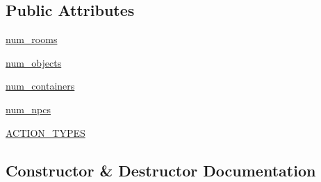 \subsection*{Public Attributes}
\begin{DoxyCompactItemize}
\item 
\hyperlink{classprojects_1_1mastering__the__dungeon_1_1agents_1_1graph__world2_1_1agents_1_1ObjectChecklistDataAgent_a0a3aeb5a5f0048b2f8af84249d447fa3}{num\+\_\+rooms}
\item 
\hyperlink{classprojects_1_1mastering__the__dungeon_1_1agents_1_1graph__world2_1_1agents_1_1ObjectChecklistDataAgent_ae5e3fbd73e051cb3d9e9f7e71fa113cd}{num\+\_\+objects}
\item 
\hyperlink{classprojects_1_1mastering__the__dungeon_1_1agents_1_1graph__world2_1_1agents_1_1ObjectChecklistDataAgent_ac2d3a47e2eaaae644df824f2206dadf2}{num\+\_\+containers}
\item 
\hyperlink{classprojects_1_1mastering__the__dungeon_1_1agents_1_1graph__world2_1_1agents_1_1ObjectChecklistDataAgent_a5bab15be5226dbff7ad3362f790abf34}{num\+\_\+npcs}
\item 
\hyperlink{classprojects_1_1mastering__the__dungeon_1_1agents_1_1graph__world2_1_1agents_1_1ObjectChecklistDataAgent_aefb8408cc9619ebe73ab7141748c4db8}{A\+C\+T\+I\+O\+N\+\_\+\+T\+Y\+P\+ES}
\end{DoxyCompactItemize}


\subsection{Constructor \& Destructor Documentation}
\mbox{\label{classprojects_1_1mastering__the__dungeon_1_1agents_1_1graph__world2_1_1agents_1_1ObjectChecklistDataAgent_a1984c21c4618f0404d9f69f399ef7fd3}} 
